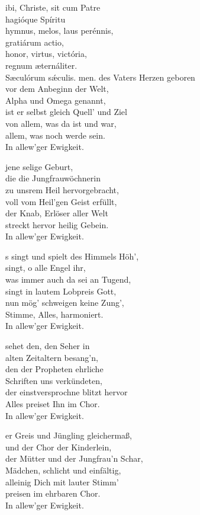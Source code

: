 \documentclass[fontsize=10pt,paper=A5,twoside,BCOR=1mm,DIV=21,headinclude]{scrarticle}
\begin{document}
\begin{paracol}{2}
\begin{hymnus}
ibi, Christe, sit cum Patre\\
hagióque Spíritu\\
hymnus, melos, laus perénnis,\\
gratiárum actio,\\
honor, virtus, victória,\\
regnum æternáliter.\\
Sæculórum s\'æculis.
men.
	\switchcolumn
{} des Vaters Herzen geboren\\
\hspace{1.6em} vor dem Anbeginn der Welt,\\
Alpha und Omega genannt,\\
ist er selbst gleich Quell' und Ziel\\
von allem, was da ist und war,\\
allem, was noch werde sein.\\
In allew'ger Ewigkeit.

 jene selige Geburt,\\
die die Jungfrauwöchnerin\\
zu unsrem Heil hervorgebracht,\\
voll vom Heil'gen Geist erfüllt,\\
der Knab, Erlöser aller Welt\\
streckt hervor heilig Gebein.\\
In allew'ger Ewigkeit.

s singt und spielt des Himmels Höh',\\
singt, o alle Engel ihr,\\
was immer auch da sei an Tugend,\\
singt in lautem Lobpreis Gott,\\
nun mög' schweigen keine Zung',\\
Stimme, Alles, harmoniert.\\
In allew'ger Ewigkeit.

 sehet den, den Seher in\\
alten Zeitaltern besang'n,\\
den der Propheten ehrliche\\
Schriften uns verkündeten,\\
der einstversprochne blitzt hervor\\
Alles preiset Ihn im Chor.\\
In allew'ger Ewigkeit.

er Greis und Jüngling gleichermaß,\\
und der Chor der Kinderlein,\\
der Mütter und der Jungfrau'n Schar,\\
Mädchen, schlicht und einfältig,\\
alleinig Dich mit lauter Stimm'\\
preisen im ehrbaren Chor.\\
In allew'ger Ewigkeit.


\end{hymnus}
\end{paracol}
\end{document}
